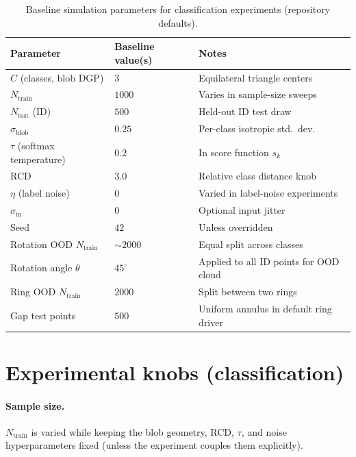 \begin{table}[htbp]
  \centering
  \caption{Baseline simulation parameters for classification experiments (repository defaults).}
  \label{tab:baseline-sim-params-clf}
  \begin{tabular}{llp{6.5cm}}
    \toprule
    Parameter & Baseline value(s) & Notes \\
    \midrule
    $C$ (classes, blob DGP) & $3$ & Equilateral triangle centers \\
    $N_{\mathrm{train}}$ & $1000$ & Varies in sample-size sweeps \\
    $N_{\mathrm{test}}$ (ID) & $500$ & Held-out ID test draw \\
    $\sigma_{\mathrm{blob}}$ & $0.25$ & Per-class isotropic std.\ dev. \\
    $\tau$ (softmax temperature) & $0.2$ & In score function $s_k$ \\
    RCD & $3.0$ & Relative class distance knob \\
    $\eta$ (label noise) & $0$ & Varied in label-noise experiments \\
    $\sigma_{\mathrm{in}}$ & $0$ & Optional input jitter \\
    Seed & $42$ & Unless overridden \\
    Rotation OOD $N_{\mathrm{train}}$ & $\sim 2000$ & Equal split across classes \\
    Rotation angle $\theta$ & $45^\circ$ & Applied to all ID points for OOD cloud \\
    Ring OOD $N_{\mathrm{train}}$ & $2000$ & Split between two rings \\
    Gap test points & $500$ & Uniform annulus in default ring driver \\
    \bottomrule
  \end{tabular}
\end{table}

\section{Experimental knobs (classification)}
\label{sec:knobs-classification}

\paragraph{Sample size.}
$N_{\mathrm{train}}$ is varied while keeping the blob geometry, RCD, $\tau$, and noise hyperparameters fixed (unless the experiment couples them explicitly).

